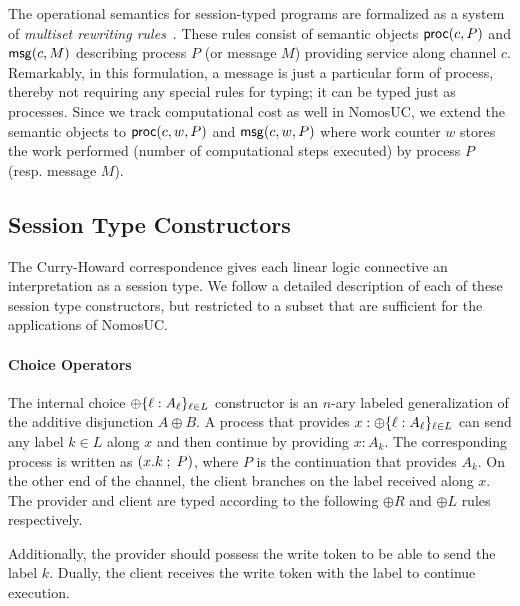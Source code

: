 The operational semantics for session-typed programs are formalized as a
system of \emph{multiset rewriting rules}~\cite{cervesato2009relating}.
These rules consist of semantic objects $\mathsf{proc}(c, P)$ and $\mathsf{msg}(c, M)$ describing
process $P$ (or message $M$) providing service along channel $c$.
Remarkably, in this formulation, a message is just a particular form of process,
thereby not requiring any special rules for typing; it can be typed just as processes.
Since we track computational cost as well in NomosUC, we extend the semantic objects
to $\mathsf{proc}(c, w, P)$ and $\mathsf{msg}(c, w, P)$ where work counter $w$ stores the work performed
(number of computational steps executed) by process $P$ (resp. message $M$).

\subsection{Session Type Constructors}
\label{subsec:constructors}

The Curry-Howard correspondence gives each linear logic connective an
interpretation as a session type.
We follow a detailed description of each of these session type constructors,
but restricted to a subset that are sufficient for the applications of NomosUC.

\paragraph*{\textbf{Choice Operators}}
The internal choice $\oplus \{ \ell : A_\ell \}_{\ell \in L}$ constructor
is an $n$-ary labeled generalization of the additive disjunction $A \oplus B$.
A process that provides $x : \oplus \{ \ell : A_\ell \}_{\ell \in L}$ can send
any label $k \in L$ along $x$ and then continue by providing $x : A_k$. The
corresponding process is written as $(x.k \; ; \; P)$, where
$P$ is the continuation that provides $A_k$.
On the other end of the channel, the client branches on the label received along $x$.
The provider and client are typed according to the following $\oplus R$ and $\oplus L$
rules respectively.
Additionally, the provider should possess the write token to be able to send the
label $k$. Dually, the client receives the write token with the label to continue
execution.

